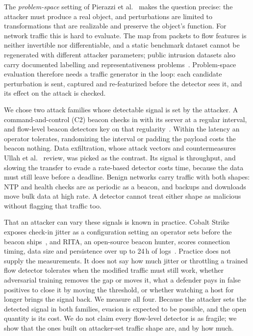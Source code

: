 \documentclass[preprint,12pt]{elsarticle}
\begin{document}
The \emph{problem-space} setting of Pierazzi et al.~\cite{pierazzi2020} makes the question precise: the
attacker must produce a real object, and perturbations are limited to transformations that are
realizable and preserve the object's function. For network traffic this is hard to evaluate. The map
from packets to flow features is neither invertible nor differentiable, and a static benchmark dataset
cannot be regenerated with different attacker parameters; public intrusion datasets also carry
documented labelling and representativeness problems~\cite{engelen2021,kenyon2020}. Problem-space evaluation therefore needs a
traffic generator in the loop: each candidate perturbation is sent, captured and re-featurized before
the detector sees it, and its effect on the attack is checked.

We chose two attack families whose detectable signal is set by the attacker. A command-and-control
(C2) beacon checks in with its server at a regular interval, and flow-level beacon detectors key on that
regularity~\cite{yilmaz2026,gardiner2014}. Within the latency an operator tolerates, randomizing the
interval or padding the payload costs the beacon nothing. Data exfiltration, whose attack vectors and
countermeasures Ullah et al.~\cite{ullah2018} review, was picked as the contrast.
Its signal is throughput, and slowing the transfer to evade a rate-based detector costs time, because
the data must still leave before a deadline. Benign networks carry traffic with both shapes: NTP and
health checks are as periodic as a beacon, and backups and downloads move bulk data at high rate. A
detector cannot treat either shape as malicious without flagging that traffic too.

That an attacker can vary these signals is known in practice. Cobalt Strike exposes check-in jitter
as a configuration setting an operator sets before the beacon ships~\cite{cobaltstrike_beacon}, and
RITA, an open-source beacon hunter, scores connection timing, data size and persistence over up to
24\,h of logs~\cite{rita2026}. Practice does not supply the measurements. It does not say how much
jitter or throttling a trained flow detector tolerates when the modified traffic must still work,
whether adversarial training removes the gap or moves it, what a defender pays in false positives to
close it by moving the threshold, or whether watching a host for longer brings the signal back. We
measure all four. Because the attacker sets the detected signal in both families, evasion is
expected to be possible, and the open quantity is its cost. We do not claim every flow-level
detector is as fragile; we show that the ones built on attacker-set traffic shape are, and by how
much.
\end{document}
